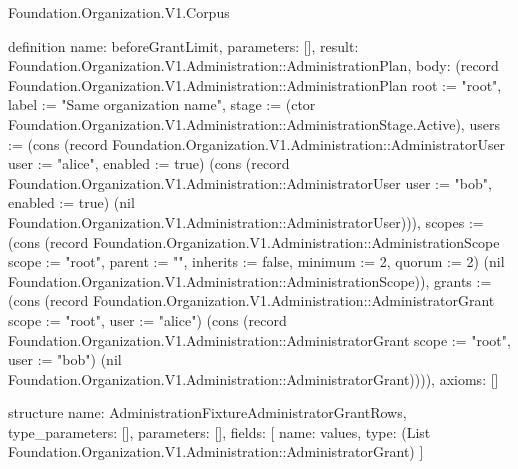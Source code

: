 \begin{lexlean}{Foundation.Organization.V1.Corpus}
\begin{semanticmodule}
definition{
  name: beforeGrantLimit,
  parameters: [],
  result: Foundation.Organization.V1.Administration::AdministrationPlan,
  body: (record Foundation.Organization.V1.Administration::AdministrationPlan {root := "root", label := "Same organization name", stage := (ctor Foundation.Organization.V1.Administration::AdministrationStage.Active), users := (cons (record Foundation.Organization.V1.Administration::AdministratorUser {user := "alice", enabled := true}) (cons (record Foundation.Organization.V1.Administration::AdministratorUser {user := "bob", enabled := true}) (nil Foundation.Organization.V1.Administration::AdministratorUser))), scopes := (cons (record Foundation.Organization.V1.Administration::AdministrationScope {scope := "root", parent := "", inherits := false, minimum := 2, quorum := 2}) (nil Foundation.Organization.V1.Administration::AdministrationScope)), grants := (cons (record Foundation.Organization.V1.Administration::AdministratorGrant {scope := "root", user := "alice"}) (cons (record Foundation.Organization.V1.Administration::AdministratorGrant {scope := "root", user := "bob"}) (nil Foundation.Organization.V1.Administration::AdministratorGrant)))}),
  axioms: []
}

structure{
  name: AdministrationFixtureAdministratorGrantRows,
  type_parameters: [],
  parameters: [],
  fields: [
    {name: values, type: (List Foundation.Organization.V1.Administration::AdministratorGrant)}
  ]
}


\end{semanticmodule}
\end{lexlean}
